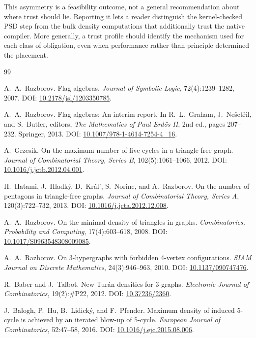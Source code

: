 \documentclass{article}
\newcommand\DOI[1]{DOI: \href{https://doi.org/#1}{#1}}
\begin{document}
{This asymmetry is a feasibility outcome, not a general recommendation about
where trust should lie.  Reporting it lets a reader distinguish the
kernel-checked PSD step from the bulk density computations that additionally
trust the native compiler.  More generally, a trust profile should identify
the mechanism used for each class of obligation, even when performance rather
than principle determined the placement.
}



\begin{thebibliography}{99}

A.~A.~Razborov.
\newblock Flag algebras.
\newblock \textit{Journal of Symbolic Logic}, 72(4):1239--1282, 2007.
  \DOI{10.2178/jsl/1203350785}.

A.~A.~Razborov.
\newblock Flag algebras: An interim report.
\newblock In R.~L.~Graham, J.~Ne\v{s}et\v{r}il, and S.~Butler, editors,
  \textit{The Mathematics of Paul Erd\H{o}s II}, 2nd ed., pages 207--232.
  Springer, 2013. \DOI{10.1007/978-1-4614-7254-4\_16}.

A.~Grzesik.
\newblock On the maximum number of five-cycles in a triangle-free graph.
\newblock \textit{Journal of Combinatorial Theory, Series B},
  102(5):1061--1066, 2012. \DOI{10.1016/j.jctb.2012.04.001}.

H.~Hatami, J.~Hladk\'{y}, D.~Kr\'{a}l', S.~Norine, and A.~Razborov.
\newblock On the number of pentagons in triangle-free graphs.
\newblock \textit{Journal of Combinatorial Theory, Series A},
  120(3):722--732, 2013. \DOI{10.1016/j.jcta.2012.12.008}.

A.~A.~Razborov.
\newblock On the minimal density of triangles in graphs.
\newblock \textit{Combinatorics, Probability and Computing}, 17(4):603--618,
  2008. \DOI{10.1017/S0963548308009085}.

A.~A.~Razborov.
\newblock On 3-hypergraphs with forbidden 4-vertex configurations.
\newblock \textit{SIAM Journal on Discrete Mathematics}, 24(3):946--963, 2010.
  \DOI{10.1137/090747476}.

R.~Baber and J.~Talbot.
\newblock New Tur\'{a}n densities for 3-graphs.
\newblock \textit{Electronic Journal of Combinatorics}, 19(2):\#P22, 2012.
  \DOI{10.37236/2360}.

J.~Balogh, P.~Hu, B.~Lidick\'{y}, and F.~Pfender.
\newblock Maximum density of induced 5-cycle is achieved by an iterated blow-up
  of 5-cycle.
\newblock \textit{European Journal of Combinatorics}, 52:47--58, 2016.
  \DOI{10.1016/j.ejc.2015.08.006}.


\end{thebibliography}
\end{document}
